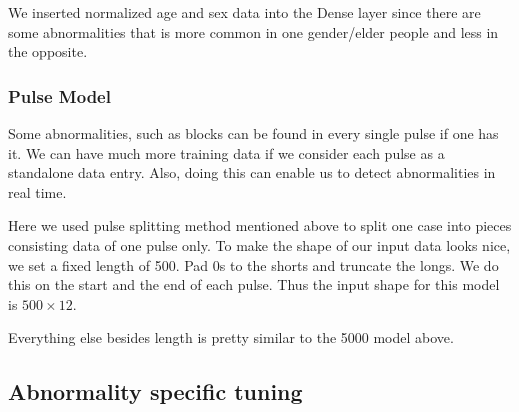 \documentclass[runningheads]{llncs}
\begin{document}
We inserted normalized age and sex data into the Dense layer since there are some abnormalities that is more common in one gender/elder people and less in the opposite. 

\subsubsection{Pulse Model}
Some abnormalities, such as blocks can be found in every single pulse if one has it. We can have much more training data if we consider each pulse as a standalone data entry. Also, doing this can enable us to detect abnormalities in real time. 

Here we used pulse splitting method mentioned above to split one case into pieces consisting data of one pulse only. To make the shape of our input data looks nice, we set a fixed length of 500. Pad 0s to the shorts and truncate the longs. We do this on the start and the end of each pulse. Thus the input shape for this model is $500 \times 12$.  

Everything else besides length is pretty similar to the 5000 model above.

\subsection{Abnormality specific tuning}
\end{document}
